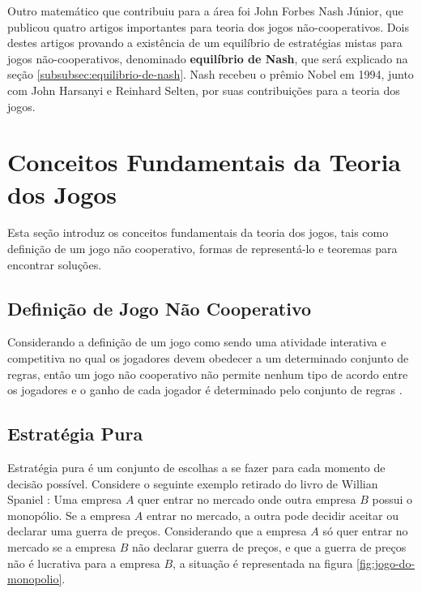 Outro matemático que contribuiu para a área foi John Forbes Nash Júnior, que publicou quatro artigos importantes para teoria dos jogos não-cooperativos. Dois destes artigos \cite{nash_1950} \cite{nash_1951} provando a existência de um equilíbrio de estratégias mistas para jogos não-cooperativos, denominado \textbf{equilíbrio de Nash}, que será explicado na seção \ref{subsubsec:equilibrio-de-nash}. Nash recebeu o prêmio Nobel em 1994, junto com John Harsanyi e Reinhard Selten, por suas contribuições para a teoria dos jogos.

\section{Conceitos Fundamentais da Teoria dos Jogos}
\label{sec:conceitos-fundamentais-da-teoria-dos-jogos}

Esta seção introduz os conceitos fundamentais da teoria dos jogos, tais como definição de um jogo não cooperativo, formas de representá-lo e teoremas para encontrar soluções.

\subsection{Definição de Jogo Não Cooperativo}
\label{subsec:definicao-de-jogo-nao-cooperativo}

Considerando a definição de um jogo como sendo uma atividade interativa e competitiva no qual os jogadores devem obedecer a um determinado conjunto de regras, então um jogo não cooperativo não permite nenhum tipo de acordo entre os jogadores e o ganho de cada jogador é determinado pelo conjunto de regras \cite{jones_1980}.

\subsection{Estratégia Pura}
\label{subsec:estrategia-pura}

Estratégia pura é um conjunto de escolhas a se fazer para cada momento de decisão possível. Considere o seguinte exemplo retirado do livro de Willian Spaniel \cite{spaniel_2011}: Uma empresa $A$ quer entrar no mercado onde outra empresa $B$ possui o monopólio. Se a empresa $A$ entrar no mercado, a outra pode decidir aceitar ou declarar uma guerra de preços. Considerando que a empresa $A$ só quer entrar no mercado se a empresa $B$ não declarar guerra de preços, e que a guerra de preços não é lucrativa para a empresa $B$, a situação é representada na figura \ref{fig:jogo-do-monopolio}.

